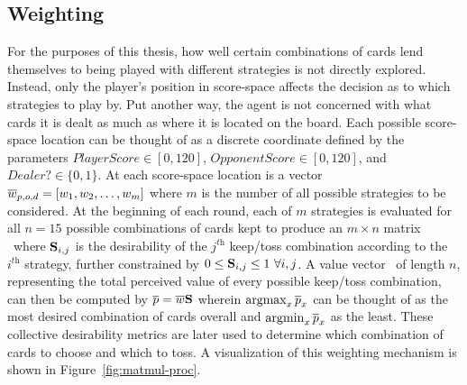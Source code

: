 

\subsection{Weighting}
\label{sec:dm-methods-weighting}



For the purposes of this thesis,
how well certain combinations of cards lend themselves to being played with 
different strategies is not directly explored.
%
Instead, only the player's position in score-space affects the decision as to
which strategies to play by.
%
Put another way, the agent is not concerned with  what cards it is dealt
as much as where it is located on the board.
%
Each possible score-space location can be thought of as a discrete coordinate
defined by the parameters
$\textit{PlayerScore} \in [0, 120]$,
$\textit{OpponentScore} \in [0, 120]$,
and
$\textit{Dealer?} \in \{0,1\}$.
%
At each score-space location is a vector $\overline{w}_{p,o,d} = [w_1,w_2,\ldots,w_m]$
where $m$ is the number of all possible strategies to be considered.
%
At the beginning of each round, each of $m$ strategies is evaluated for all
$n = 15$ possible combinations of cards kept to produce an
$m \times n$ matrix \Smat\
where $\mathbf{S}_{i,j}$ is the desirability of the $j^{\textit{th}}$ keep/toss
combination according to the $i^{\textit{th}}$ strategy,
further constrained by
$0 \le \mathbf{S}_{i,j} \le 1\ \forall i,j$.
%
A value vector \pvec\ of length $n$,
representing the total perceived value of every possible keep/toss combination,
can then be computed by
$\overline{p} = \overline{w} \mathbf{S}$
wherein $\operatorname*{argmax}_{x}{\overline{p}_x}$ can be thought of as the most desired combination
of cards overall and $\operatorname*{argmin}_{x}{\overline{p}_x}$ as the least.
%
These collective desirability metrics are later used to determine which
combination of cards to choose and which to toss.
%
A visualization of this weighting mechanism is shown in
Figure~\ref{fig:matmul-proc}.




